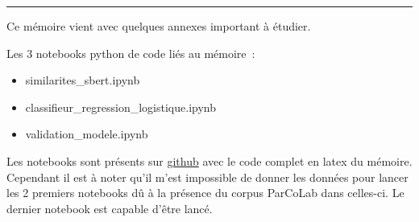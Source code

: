 \noindent\rule{\textwidth}{0.4pt}
\thispagestyle{empty}

Ce mémoire vient avec quelques annexes important à étudier.

Les 3 notebooks python de code liés au mémoire~:
\begin{itemize}
    \item similarites\_sbert.ipynb
    \item classifieur\_regression\_logistique.ipynb
    \item validation\_modele.ipynb
\end{itemize}

Les notebooks sont présents sur \href{https://github.com/thibaultDumortier/Thesis}{github} avec le code complet en latex du mémoire.
Cependant il est à noter qu'il m'est impossible de donner les données pour lancer les 2
premiers notebooks dû à la présence du corpus ParCoLab dans celles-ci. Le dernier notebook
est capable d'être lancé.
